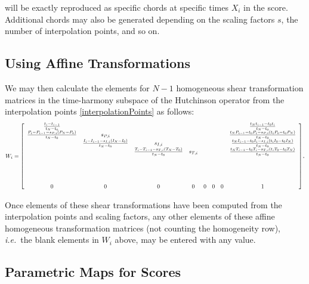 \documentclass[english,11pt,letterpaper,onecolumn]{scrartcl}
\newcommand\scalemath[2]{\scalebox{#1}{\mbox{\ensuremath{\displaystyle #2}}}}
\numberwithin{equation}{section}
\begin{document}
\noindent will be exactly reproduced as specific chords at specific times $X_i$
in the score. Additional chords may also be generated depending on the scaling
factors $s$, the number of interpolation points, and so on.

\subsection{Using Affine Transformations}

\boindent We may then calculate the elements for $N-1$ homogeneous shear
transformation matrices in the time-harmony subspace of the Hutchinson operator
from the interpolation points \eqref{interpolationPoints} as follows:
\[
  \scalemath{0.75}{
  W_i=
  \left[ {\begin{array}{cccccccc}
    \frac{t_i - t_{i-1}}{t_N - t_0}                           &            &   &   &   &   &   &  \frac{t_N t_{i-1} - t_0 t_i}{t_N - t_0}                               \\
    \frac{P_i - P_{i-1} - s_{P,i} (P_N - P_0)}{t_N - t_0}     & s_{P,i}    &   &   &   &   &   &  \frac{t_N P_{i-1} - t_0 P_i - s_{P,i} (t_i P_0 - t_0 P_N)}{t_N - t_0} \\
    &  \frac{I_i - I_{i-1} - s_{I,i} (I_N - I_0)}{t_N - t_0}  & s_{I,i}    &   &   &   &       &  \frac{t_N I_{i-1} - t_0 I_i - s_{I,i} (t_i I_0 - t_0 I_N)}{t_N - t_0} \\
    &   & \frac{T_i - T_{i-1} - s_{T,i} (T_N - T_0)}{t_N - t_0} & s_{T,i}  &   &   &           &  \frac{t_N T_{i-1} - t_0 T_i - s_{T,i} (t_i T_0 - t_0 T_N)}{t_N - t_0} \\
    &   &   &   &   &   &   &  \\
    &   &   &   &   &   &   &  \\
    &   &   &   &   &   &   &  \\
    &   &   &   &   &   &   &  \\
    0 & 0 & 0 & 0 & 0 & 0 & 0 & 1\\
  \end{array} } \right]}.
\]

\noindent Once elements of these shear transformations have been computed from
the interpolation points and scaling factors, any other elements of these affine
homogeneous transformation matrices (not counting the homogeneity row),
\emph{i.e.}\ the blank elements in $W_i$ above, may be entered with any value.


\subsection{Parametric Maps for Scores}
\end{document}
